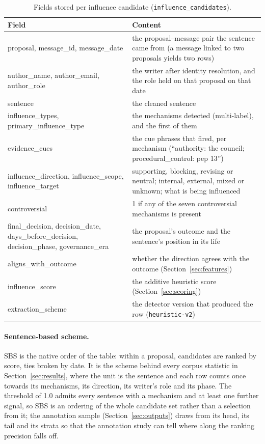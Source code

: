\documentclass[sigconf,screen]{acmart}
\begin{document}
\begin{table}[t]
\caption{Fields stored per influence candidate (\texttt{influence\_candidates}).}
\label{tab:fields}
\footnotesize
\begin{tabular}{p{}p{}}
\toprule
Field & Content \\
\midrule
proposal, message\_id, message\_date & the proposal--message pair the sentence came from (a message linked to two proposals yields two rows) \\
author\_name, author\_email, author\_role & the writer after identity resolution, and the role held on that proposal on that date \\
sentence & the cleaned sentence \\
influence\_types, primary\_influence\_type & the mechanisms detected (multi-label), and the first of them \\
evidence\_cues & the cue phrases that fired, per mechanism (``authority: the council; procedural\_control: pep 13'') \\
influence\_direction, influence\_scope, influence\_target & supporting, blocking, revising or neutral; internal, external, mixed or unknown; what is being influenced \\
controversial & 1 if any of the seven controversial mechanisms is present \\
final\_decision, decision\_date, days\_before\_decision, decision\_phase, governance\_era & the proposal's outcome and the sentence's position in its life \\
aligns\_with\_outcome & whether the direction agrees with the outcome (Section~\ref{sec:features}) \\
influence\_score & the additive heuristic score (Section~\ref{sec:scoring}) \\
extraction\_scheme & the detector version that produced the row (\texttt{heuristic-v2}) \\
\bottomrule
\end{tabular}
\end{table}

\paragraph{Sentence-based scheme.} SBS is the native order of the table: within a proposal, candidates are ranked by score, ties broken by date. It is the scheme behind every corpus statistic in Section~\ref{sec:results}, where the unit is the sentence and each row counts once towards its mechanisms, its direction, its writer's role and its phase. The threshold of 1.0 admits every sentence with a mechanism and at least one further signal, so SBS is an ordering of the whole candidate set rather than a selection from it; the annotation sample (Section~\ref{sec:outputs}) draws from its head, its tail and its strata so that the annotation study can tell where along the ranking precision falls off.
\end{document}
